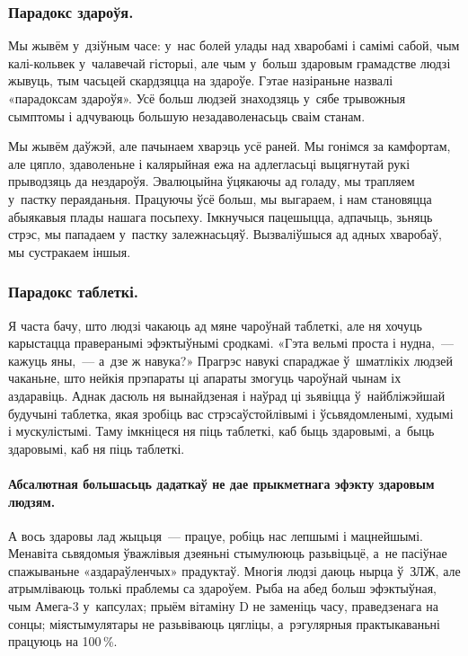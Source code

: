 \subsubsection{Парадокс здароўя.}

Мы жывём у~дзіўным часе: у~нас болей улады над хваробамі і самімі сабой, чым калі-кольвек у~чалавечай гісторыі, але чым у~больш здаровым грамадстве людзі жывуць, тым часьцей скардзяцца на здароўе. Гэтае назіраньне назвалі «парадоксам здароўя». Усё больш людзей знаходзяць у~сябе трывожныя сымптомы і адчуваюць большую незадаволенасьць сваім станам.

Мы жывём даўжэй, але пачынаем хварэць усё раней. Мы гонімся за камфортам, але цяпло, здаволеньне і калярыйная ежа на адлегласьці выцягнутай рукі прыводзяць да нездароўя. Эвалюцыйна ўцякаючы ад голаду, мы трапляем у~пастку пераяданьня. Працуючы ўсё больш, мы выгараем, і нам становяцца абыякавыя плады нашага посьпеху. Імкнучыся пацешыцца, адпачыць, зьняць стрэс, мы пападаем у~пастку залежнасьцяў. Вызваліўшыся ад адных хваробаў, мы сустракаем іншыя.

\subsubsection{Парадокс таблеткі.}

Я часта бачу, што людзі чакаюць ад мяне чароўнай таблеткі, але ня хочуць карыстацца праверанымі эфэктыўнымі сродкамі. «Гэта вельмі проста і нудна,~--- кажуць яны,~--- а~дзе ж навука?» Прагрэс навукі спараджае ў~шматлікіх людзей чаканьне, што нейкія прэпараты ці апараты змогуць чароўнай чынам іх аздаравіць. Аднак дасюль ня вынайдзеная і наўрад ці зьявіцца ў~найбліжэйшай будучыні таблетка, якая зробіць вас стрэсаўстойлівымі і ўсьвядомленымі, худымі і мускулістымі. Таму імкніцеся ня піць таблеткі, каб быць здаровымі, а~быць здаровымі, каб ня піць таблеткі.

\paragraph{Абсалютная большасьць дадаткаў не дае прыкметнага эфэкту здаровым людзям.} А вось здаровы лад жыцьця~--- працуе, робіць нас лепшымі і мацнейшымі. Менавіта сьвядомыя ўважлівыя дзеяньні стымулююць разьвіцьцё, а~не пасіўнае спажываньне «аздараўленчых» прадуктаў. Многія людзі даюць нырца ў~ЗЛЖ, але атрымліваюць толькі праблемы са здароўем. Рыба на абед больш эфэктыўная, чым Амега-3 у~капсулах; прыём вітаміну D не заменіць часу, праведзенага на сонцы; міястымулятары не разьвіваюць цягліцы, а~рэгулярныя практыкаваньні працуюць на 100\,\%.


